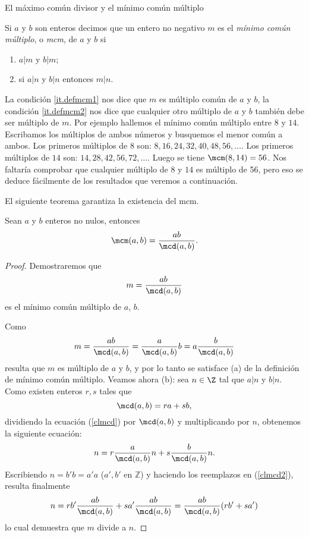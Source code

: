 \begin{section}{El máximo común divisor y el mínimo común
múltiplo}
\begin{definicion}\label{def-mcm}
Si $a$ y $b$ son enteros decimos que un entero no negativo $m$ es el \textit{mínimo común múltiplo}, o \textit{mcm}, de $a$ y $b$ si
\begin{enumerate}[label=\textit{\alph*)}]
\item\label{it.defmcm1} $ a|m$ y $b|m$;
\item\label{it.defmcm2} si $ a|n $ y $b|n$ entonces $ m|n$.
\end{enumerate}
\end{definicion}
La condición \ref{it.defmcm1} nos dice que $m$ es múl\-ti\-plo común de $a$ y $b$, la condición \ref{it.defmcm2} nos dice que cualquier otro múltiplo de $a$ y $b$ también debe ser múltiplo de $m$. Por ejemplo hallemos el mínimo común múltiplo entre $8$ y $14$. Escribamos los múl\-ti\-plos de ambos números y busquemos el menor común a ambos. Los primeros múltiplos de $8$ son: $8,16,24,32,40,48,56,\ldots$. Los primeros múltiplos de $14$ son: $14,28,42,56,72,\ldots$. Luego se tiene $\mcm(8,14)=56$. Nos faltaría  comprobar que cualquier múltiplo de $8$ y $14$ es múltiplo de 56, pero eso se deduce fácilmente de los resultados que veremos a continuación.

El siguiente teorema garantiza la existencia del mcm.

\begin{teorema}\label{t1.7.2} Sean $a$ y $b$ enteros no nulos, entonces
$$
\mcm(a,b)=\frac{a b}{\mcd(a,b)}.
$$
\end{teorema}
\begin{proof} Demostraremos que
$$
m=\frac{a b}{\mcd(a,b)}
$$
es el mínimo común múltiplo de $a$, $b$.

Como
$$
m=\frac{a b}{\mcd(a,b)}=\frac{a}{\mcd(a,b)} b
=a\frac{b}{\mcd(a,b)}
$$
resulta que $m$ es múltiplo de $a$ y $b$, y por lo tanto se satisface (a) de la definición de mínimo común múltiplo. Veamos ahora (b): sea $n \in \Z$ tal que  $a|n$ y $b|n$. Como  existen enteros $r,s$ tales que 
\begin{equation}\label{clmcd}
\mcd(a,b)=ra+sb,
\end{equation} 
dividiendo la ecuación (\ref{clmcd}) por $\mcd(a,b)$ y multiplicando por $n$, obtenemos la si\-guien\-te ecuación:
\begin{equation}\label{clmcd2}
n= r\frac{a}{\mcd(a,b)}n + s\frac{b}{\mcd(a,b)}n.
\end{equation} 
Escribiendo $n=b'b=a'a$ ($a',b'$ en $\mathbb Z$) y haciendo los reemplazos en (\ref{clmcd2}), resulta
finalmente
\begin{equation*}
n= rb'\frac{a b}{\mcd(a,b)}+sa'\frac{a b}{\mcd(a,b)}= \frac{a
b}{\mcd(a,b)}(rb'+sa')
\end{equation*}
lo cual demuestra que $m$ divide a $n$.
\end{proof}


\end{section}
